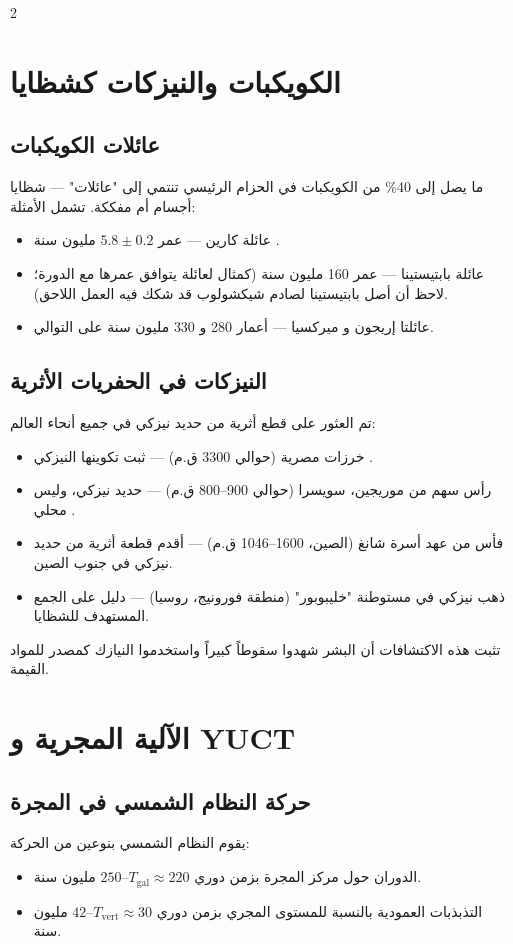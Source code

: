 \documentclass[11pt,a4paper]{article}
\begin{document}
\begin{multicols}{2}
		\section{الكويكبات والنيزكات كشظايا}
		\subsection{عائلات الكويكبات}
		ما يصل إلى 40\% من الكويكبات في الحزام الرئيسي تنتمي إلى "عائلات" — شظايا أجسام أم مفككة. تشمل الأمثلة:
		\begin{itemize}
			\item عائلة كارين — عمر \(5.8 \pm 0.2\) مليون سنة \cite{Nesvorny2002}.
			\item عائلة بابتيستينا — عمر 160 مليون سنة (كمثال لعائلة يتوافق عمرها مع الدورة؛ لاحظ أن أصل بابتيستينا لصادم شيكشولوب قد شكك فيه العمل اللاحق).
			\item عائلتا إريجون و ميركسيا — أعمار 280 و 330 مليون سنة على التوالي.
		\end{itemize}
		
		\subsection{النيزكات في الحفريات الأثرية}
		تم العثور على قطع أثرية من حديد نيزكي في جميع أنحاء العالم:
		\begin{itemize}
			\item خرزات مصرية (حوالي 3300 ق.م) — ثبت تكوينها النيزكي \cite{Rehren2013}.
			\item رأس سهم من موريجين، سويسرا (حوالي 900–800 ق.م) — حديد نيزكي، وليس محلي \cite{Hofmann2023}.
			\item فأس من عهد أسرة شانغ (الصين، 1600–1046 ق.م) — أقدم قطعة أثرية من حديد نيزكي في جنوب الصين.
			\item ذهب نيزكي في مستوطنة "خليبوبور" (منطقة فورونيج، روسيا) — دليل على الجمع المستهدف للشظايا.
		\end{itemize}
		تثبت هذه الاكتشافات أن البشر شهدوا سقوطاً كبيراً واستخدموا النيازك كمصدر للمواد القيمة.
		
		\section{الآلية المجرية و YUCT}
		\subsection{حركة النظام الشمسي في المجرة}
		يقوم النظام الشمسي بنوعين من الحركة:
		\begin{itemize}
			\item الدوران حول مركز المجرة بزمن دوري \(T_{\text{gal}} \approx 220\)–\(250\) مليون سنة.
			\item التذبذبات العمودية بالنسبة للمستوى المجري بزمن دوري \(T_{\text{vert}} \approx 30\)–\(42\) مليون سنة.
		\end{itemize}
		

\end{multicols}
\end{document}
